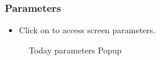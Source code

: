 \documentclass[letterpaper,10pt,english]{sphinxmanual}
\begin{document}
\subsubsection{Parameters}
\label{Today:parameters}\begin{itemize}
\item {} 
Click on  to access screen parameters.

\end{itemize}
\begin{figure}[htbp]
\centering
\capstart

\caption{Today parameters Popup}\end{figure}
\end{document}
